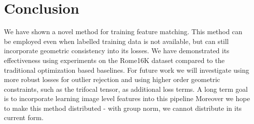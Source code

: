 \documentclass[10pt,twocolumn,letterpaper]{article}
\begin{document}
\section{Conclusion}

We have shown a novel method for training feature matching.
This method can be employed even when labelled training data is not available, but can still incorporate geometric consistency into its losses.
We have demonstrated its effectiveness using experiments on the Rome16K dataset compared to the traditional optimization based baselines.
For future work we will investigate using more robust losses for outlier rejection and using higher order geometric constraints, such as the trifocal tensor, as additional loss terms.
A long term goal is to incorporate learning image level features into this pipeline
Moreover we hope to make this method distributed - with group norm, we cannot distribute in its current form.

{\small


}
\end{document}
